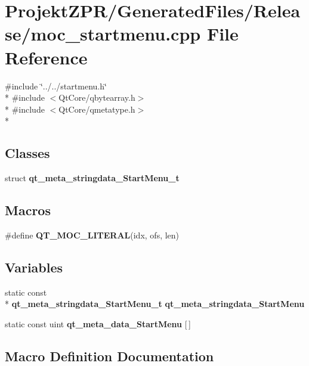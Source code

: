 \section{Projekt\-Z\-P\-R/\-Generated\-Files/\-Release/moc\-\_\-startmenu.cpp File Reference}
\label{_release_2moc__startmenu_8cpp}
{\ttfamily \#include \char`\"{}../../startmenu.\-h\char`\"{}}\\*
{\ttfamily \#include $<$Qt\-Core/qbytearray.\-h$>$}\\*
{\ttfamily \#include $<$Qt\-Core/qmetatype.\-h$>$}\\*
\subsection*{Classes}
\begin{DoxyCompactItemize}
\item 
struct {\bf qt\-\_\-meta\-\_\-stringdata\-\_\-\-Start\-Menu\-\_\-t}
\end{DoxyCompactItemize}
\subsection*{Macros}
\begin{DoxyCompactItemize}
\item 
\#define {\bf Q\-T\-\_\-\-M\-O\-C\-\_\-\-L\-I\-T\-E\-R\-A\-L}(idx, ofs, len)
\end{DoxyCompactItemize}
\subsection*{Variables}
\begin{DoxyCompactItemize}
\item 
static const \\*
{\bf qt\-\_\-meta\-\_\-stringdata\-\_\-\-Start\-Menu\-\_\-t} {\bf qt\-\_\-meta\-\_\-stringdata\-\_\-\-Start\-Menu}
\item 
static const uint {\bf qt\-\_\-meta\-\_\-data\-\_\-\-Start\-Menu} [$\,$]
\end{DoxyCompactItemize}


\subsection{Macro Definition Documentation}
